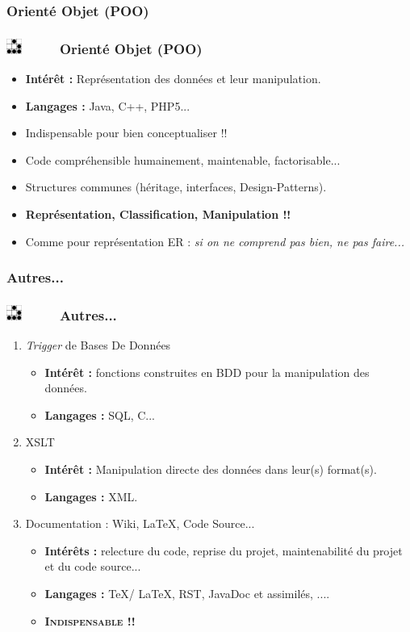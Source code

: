 \documentclass[slidetop,11pt]{beamer}
\def\sectionPartIcDE{Orient{\'e} Objet (POO)}
\def\sectionPartIcTR{Autres...}
\def\moreInFrameTitle{\includegraphics[height=0.5cm]{img/logo_glider.png}~~~~~}
\begin{document}
\subsubsection{\sectionPartIcDE}
\begin{frame}
	\frametitle{\moreInFrameTitle \sectionPartIcDE}
	\begin{itemize}	
		\item \textbf{Int{\'e}r{\^e}t : } Repr{\'e}sentation des donn{\'e}es et leur manipulation. 
		\item \textbf{Langages : } Java, C++, PHP5...
		\item Indispensable pour bien conceptualiser !!
		\item Code compr{\'e}hensible humainement, maintenable, factorisable... 
		\item Structures communes (h{\'e}ritage, interfaces, Design-Patterns). 
		\item \textbf{Repr{\'e}sentation, Classification, Manipulation !!}
		\item Comme pour repr{\'e}sentation ER : \emph{si on ne comprend pas bien, ne pas faire...}
	\end{itemize}
\end{frame} 

\subsubsection{\sectionPartIcTR}
\begin{frame}
	\frametitle{\moreInFrameTitle \sectionPartIcTR}
	\begin{enumerate}
		\item \emph{Trigger} de Bases De Donn{\'e}es
		\begin{itemize}	
			\item \textbf{Int{\'e}r{\^e}t : } fonctions construites en BDD pour la manipulation des donn{\'e}es. 
			\item \textbf{Langages : } SQL, C...
		\end{itemize}
		\item XSLT
		\begin{itemize}	
			\item \textbf{Int{\'e}r{\^e}t : } Manipulation directe des donn{\'e}es dans leur(s) format(s). 
			\item \textbf{Langages : } XML. 
		\end{itemize}
		\item Documentation : Wiki, \LaTeX, Code Source...
		\begin{itemize}	
			\item \textbf{Int{\'e}r{\^e}ts : } relecture du code, reprise du projet, maintenabilit{\'e} du projet et du code source...
			\item \textbf{Langages : } \TeX / \LaTeX, RST, JavaDoc et assimil{\'e}s, .... 
			\item \textsc{\textbf{Indispensable !!}}
		\end{itemize}
	\end{enumerate}
\end{frame} 
\end{document}
